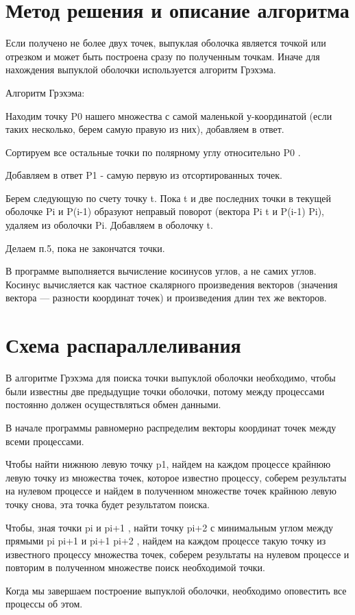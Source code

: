 \documentclass{report}
\begin{document}
\newpage

\section*{Метод решения и описание алгоритма}
\par
Если получено не более двух точек, выпуклая оболочка является точкой или отрезком и может быть построена сразу по полученным точкам. Иначе для нахождения выпуклой оболочки используется алгоритм Грэхэма.

\par 
Алгоритм Грэхэма:
\par 
	Находим точку P0 нашего множества с самой маленькой у-координатой (если таких несколько, берем самую правую из них), добавляем в ответ.
\par 
	Сортируем все остальные точки по полярному углу относительно P0 .
\par 
	Добавляем в ответ P1 - самую первую из отсортированных точек.
\par 
	Берем следующую по счету точку t. Пока t и две последних точки в текущей оболочке Pi и P(i-1) образуют неправый поворот (вектора Pi t и P(i-1) Pi), удаляем из оболочки Pi.
	Добавляем в оболочку t.
\par 
\par 
	Делаем п.5, пока не закончатся точки.
\par 
В программе выполняется вычисление косинусов углов, а не самих углов.
Косинус вычисляется как частное скалярного произведения векторов (значения вектора — разности координат точек) и произведения длин тех же векторов.
\newpage




\section*{Схема распараллеливания}
В алгоритме Грэхэма для поиска точки выпуклой оболочки необходимо, чтобы были известны две предыдущие точки оболочки, потому между процессами постоянно должен осуществляться обмен данными.
\par 
\par 
В начале программы равномерно распределим векторы координат точек между всеми процессами.
\par 
Чтобы найти нижнюю левую точку p1, найдем на каждом процессе крайнюю левую точку из множества точек, которое известно процессу, соберем результаты на нулевом процессе и найдем в полученном множестве точек крайнюю левую точку снова, эта точка будет результатом поиска.
\par 
Чтобы, зная точки pi и pi+1 , найти точку pi+2 с минимальным углом между прямыми  pi pi+1 и  pi+1 pi+2 , найдем на каждом процессе такую точку из известного процессу множества точек, соберем результаты на нулевом процессе и повторим в полученном множестве поиск необходимой точки.
\par 
Когда мы завершаем построение выпуклой оболочки, необходимо оповестить все процессы об этом.
\end{document}
